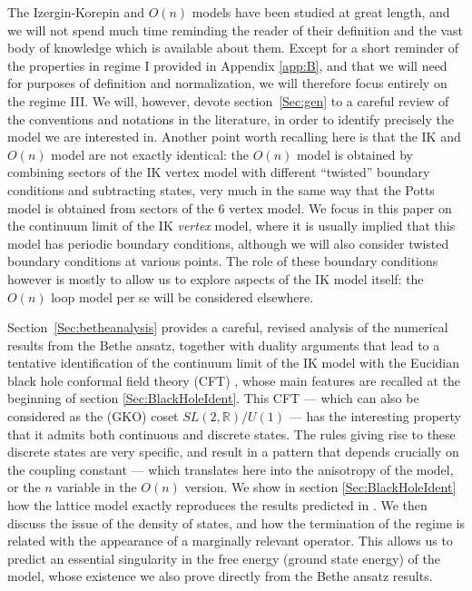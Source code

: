 \documentclass[11pt]{article}
\begin{document}
The Izergin-Korepin and $O(n)$ models have been studied at great length, and we will not spend much time reminding the reader of their definition and the vast body of knowledge which is available about them. Except for a short reminder of the properties in regime I provided in Appendix \ref{app:B}, and that we will need for purposes of definition and normalization, we will therefore focus entirely on the regime III. We will, however, devote section~\ref{Sec:gen} to a careful review of the conventions and notations in the literature, in order to identify precisely the model we are interested in. Another point worth recalling here is that the IK and $O(n)$ model are not exactly identical: the $O(n)$ model is obtained by combining sectors of the IK vertex model with different ``twisted'' boundary conditions and subtracting states, very much in the same way that the Potts model is obtained from sectors of the 6 vertex model. We focus in this paper on the continuum limit of the IK {\sl vertex} model, where it is 
usually implied that this model has periodic boundary conditions, although we will also consider twisted boundary conditions at various points. The role of these boundary conditions however is mostly to allow us to explore aspects of the IK model itself: the $O(n)$ loop model per se will be considered elsewhere.  

Section~\ref{Sec:betheanalysis} provides a careful, revised analysis of the numerical results from the Bethe ansatz, together with duality arguments that lead to a tentative identification of the continuum limit of the IK model with the Eucidian black hole conformal field theory (CFT) \cite{BlackHoleCFT}, whose main features are recalled at the beginning of section \ref{Sec:BlackHoleIdent}.  This CFT --- which can also be considered as the (GKO) coset $SL(2,\mathbb{R})/U(1)$ --- has the interesting property that it admits both continuous and discrete states.  The rules giving rise to these discrete states are very specific, and result in a pattern that depends crucially on the coupling constant --- which translates here into the anisotropy of the model, or the $n$ variable in the $O(n)$ version. We show in section \ref{Sec:BlackHoleIdent} how the lattice model exactly reproduces the results predicted in \cite{Troost,RibSch}. We then discuss the issue of the density of states, and how the termination of the 
regime is related with the appearance of a marginally relevant operator. This allows us to predict an essential singularity in the free energy (ground state energy) of the model, whose existence we also prove directly from the Bethe ansatz results.  
\end{document}
